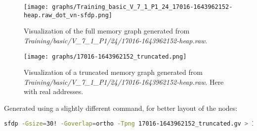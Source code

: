 \begin{figure}[H]\label{appendix:mem_graph:17016-1643962152:full}
    \centering
    \texttt{[image: graphs/Training\_basic\_V\_7\_1\_P1\_24\_17016-1643962152-heap.raw\_dot\_vn-sfdp.png]}
    \caption{Visualization of the full memory graph generated from \textit{Training/basic/V\_7\_1\_P1/24/17016-1643962152-heap.raw}.}
\end{figure}

\begin{figure}[H]\label{appendix:mem_graph:17016-1643962152:truncated}
    \centering
    \texttt{[image: graphs/17016-1643962152\_truncated.png]}
    \caption{Visualization of a truncated memory graph generated from \textit{Training/basic/V\_7\_1\_P1/24/17016-1643962152-heap.raw}. Here with real addresses.}
\end{figure}

Generated using a slightly different command, for better layout of the nodes:

\begin{lstlisting}[language=bash, caption={Command used to generate the memory graph visualization of \textit{Training/basic/V\_7\_1\_P1/24/17016-1643962152-heap.raw} here using real addresses.}]
    sfdp -Gsize=30! -Goverlap=ortho -Tpng 17016-1643962152_truncated.gv > 17016-1643962152_truncated.png
\end{lstlisting}
